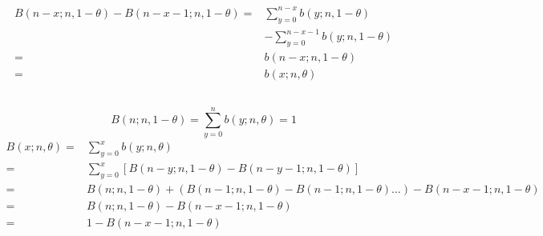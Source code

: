 \documentclass{article}
\begin{document}
    \subsection{}
        \paragraph{
            \begin{equation*}
                \begin{split}
                    B(n-x;n,1-\theta)-B(n-x-1;n,1-\theta)=&\sum_{y=0}^{n-x}b(y;n,1-\theta)\\
                        &-\sum_{y=0}^{n-x-1}b(y;n,1-\theta)\\
                        =&b(n-x;n,1-\theta)\\
                        =&b(x;n,\theta)
                \end{split}
            \end{equation*}
        }
    \subsection{}
        \paragraph{
            $$B(n;n,1-\theta)=\sum_{y=0}^nb(y;n,\theta)=1$$
            \begin{equation*}
                \begin{split}
                    B(x;n,\theta)=&\sum_{y=0}^xb(y;n,\theta)\\
                        =&\sum_{y=0}^x[B(n-y;n,1-\theta)-B(n-y-1;n,1-\theta)]\\
                        =&B(n;n,1-\theta)+(B(n-1;n,1-\theta)-B(n-1;n,1-\theta)...)-B(n-x-1;n,1-\theta)\\
                        =&B(n;n,1-\theta)-B(n-x-1;n,1-\theta)\\
                        =&1-B(n-x-1;n,1-\theta)\\
                \end{split}
            \end{equation*}
        }
\end{document}
